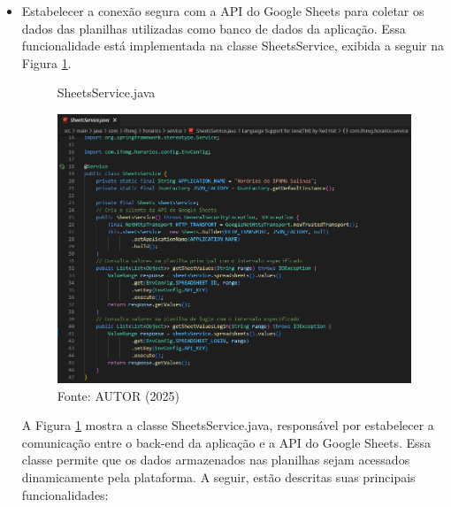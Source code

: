 \begin{itemize}
    \item Estabelecer a conexão segura com a API do Google Sheets para coletar os dados das planilhas utilizadas como banco de dados da aplicação. Essa funcionalidade está implementada na classe SheetsService, exibida a seguir na Figura \ref{fig_back_2}.
    
    \begin{figure}[H]
        \centering
        \caption{SheetsService.java}
        \includegraphics[width=1\textwidth]{Figuras/back-2.png}
        \caption*{Fonte: AUTOR (2025)}
        \label{fig_back_2}
    \end{figure}

    A Figura \ref{fig_back_2} mostra a classe SheetsService.java, responsável por estabelecer a comunicação entre o back-end da aplicação e a API do Google Sheets. Essa classe permite que os dados armazenados nas planilhas sejam acessados dinamicamente pela plataforma. A seguir, estão descritas suas principais funcionalidades:


\end{itemize}
